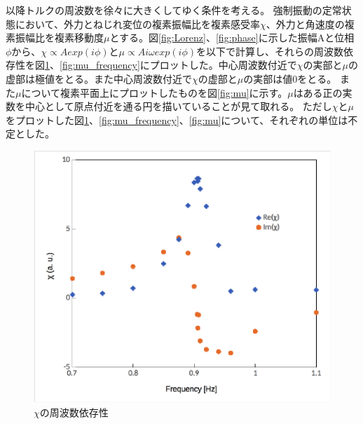 \documentclass[11pt,a4]{jarticle}
\begin{document}
以降トルクの周波数を徐々に大きくしてゆく条件を考える。
強制振動の定常状態において、外力とねじれ変位の複素振幅比を複素感受率$\chi$、外力と角速度の複素振幅比を複素移動度$\mu$とする。図\ref{fig:Lorenz}、\ref{fig:phase}に示した振幅Aと位相$\phi$から、$\chi \propto Aexp(i\phi)$と$\mu \propto A i\omega exp(i\phi)$を以下で計算し、それらの周波数依存性を図\ref{fig:chi_frequency}、\ref{fig:mu_frequency}にプロットした。中心周波数付近で$\chi$の実部と$\mu$の虚部は極値をとる。また中心周波数付近で$\chi$の虚部と$\mu$の実部は値0をとる。
また$\mu$について複素平面上にプロットしたものを図\ref{fig:mu}に示す。$\mu$はある正の実数を中心として原点付近を通る円を描いていることが見て取れる。
ただし$\chi$と$\mu$をプロットした図\ref{fig:chi_frequency}、\ref{fig:mu_frequency}、\ref{fig:mu}について、それぞれの単位は不定とした。

\begin{figure}[htbp]
 \begin{minipage}{0.5\hsize}
   \begin{center}
    \includegraphics[width=0.9\hsize]{./chi_frequency.eps}
    \caption{$\chi$の周波数依存性}
     \label{fig:chi_frequency}
   \end{center}
 \end{minipage}
 \begin{minipage}{0.5\hsize}
   \begin{center}

\end{center}
\end{minipage}
\end{figure}
\end{document}
